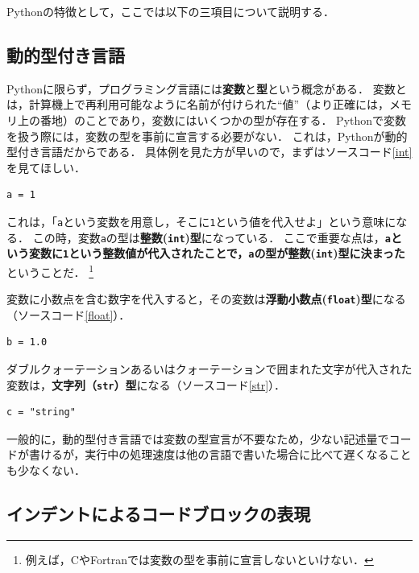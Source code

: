 \documentclass[a4paper,12pt]{jsarticle}
\begin{document}
Pythonの特徴として，ここでは以下の三項目について説明する．

\subsection{動的型付き言語}
Pythonに限らず，プログラミング言語には{\bf 変数}と{\bf 型}という概念がある．
変数とは，計算機上で再利用可能なように名前が付けられた“値”（より正確には，メモリ上の番地）のことであり，変数にはいくつかの型が存在する．
Pythonで変数を扱う際には，変数の型を事前に宣言する必要がない．
これは，Pythonが動的型付き言語だからである．
具体例を見た方が早いので，まずはソースコード\ref{int}を見てほしい．
\begin{lstlisting}[caption=整数(\texttt{int})型,label=int]
 a = 1
\end{lstlisting}
これは，「\texttt{a}という変数を用意し，そこに\texttt{1}という値を代入せよ」という意味になる．
この時，変数\texttt{a}の型は{\bf 整数(\texttt{int})型}になっている．
ここで重要な点は，{\bf \texttt{a}という変数に\texttt{1}という整数値が代入されたことで，\texttt{a}の型が整数(\texttt{int})型に決まった}ということだ．
\footnote{例えば，CやFortranでは変数の型を事前に宣言しないといけない．}

変数に小数点を含む数字を代入すると，その変数は{\bf 浮動小数点(\texttt{float})型}になる（ソースコード\ref{float}）．
\begin{lstlisting}[caption=浮動小数点(\texttt{float})型,label=float]
 b = 1.0
\end{lstlisting}

ダブルクォーテーションあるいはクォーテーションで囲まれた文字が代入された変数は，{\bf 文字列（\texttt{str}）型}になる（ソースコード\ref{str}）．
\begin{lstlisting}[caption=文字列（\texttt{str}）型,label=str]
 c = "string"
\end{lstlisting}

一般的に，動的型付き言語では変数の型宣言が不要なため，少ない記述量でコードが書けるが，実行中の処理速度は他の言語で書いた場合に比べて遅くなることも少なくない．

\subsection{インデントによるコードブロックの表現}
\end{document}
